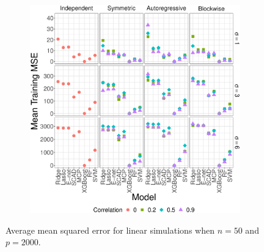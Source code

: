 \documentclass{article}
\begin{document}
\begin{figure}[!htb]
\begin{subfigure}[b]{0.47\textwidth}
			\includegraphics[width=\textwidth]{images/facet/publication_facet_train_mse_nonlinear_50_2000.eps}
			\label{fig:nonlinear-train-mse}
		\end{subfigure}
		\caption{Average mean squared error for linear simulations when $n = 50$ and $p = 2000$.}
		\label{fig:nonlinear-mse}
	\end{figure}
	
\end{document}
